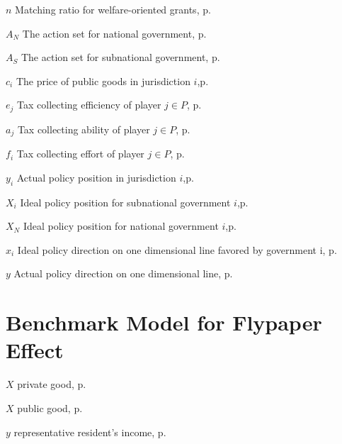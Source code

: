 \begin{eqlist}
    \item[$n$]
    Matching ratio for welfare-oriented grants, p.~\pageref{generalandcategorical}

    \item[$A_N$]
    The action set for national government, p.~\pageref{generalandcategorical}

    \item[$A_S$]
    The action set for subnational government, p.~\pageref{generalandcategorical}

    \item[$c_i$]
    The price of public goods in jurisdiction $i$,p.~\pageref{priceandeffort}

    \item[$e_j$]
    Tax collecting efficiency of player $j \in P$, p.~\pageref{priceandeffort}

    \item[$a_j$]
    Tax collecting ability of player $j \in P$, p.~\pageref{priceandeffort}

    \item[$f_i$]
    Tax collecting effort of player $j \in P$, p.~\pageref{priceandeffort}

    \item[$y_i$]
    Actual policy position in jurisdiction $i$,p.~\pageref{actposition}

    \item[$X_i$]
    Ideal policy position for subnational government $i$,p.~\pageref{iposition}

    \item[$X_N$]
    Ideal policy position for national government $i$,p.~\pageref{actposition}

    \item[$x_i$]
    Ideal policy direction on one dimensional line favored by government i, p.~\pageref{demand}

    \item[$y$]
    Actual policy direction on one dimensional line, p.~\pageref{demand}
    \section*{Benchmark Model for Flypaper Effect}

    \item[$X$]
    private good, p.~\pageref{G}

    \item[$X$]
    public good, p.~\pageref{X}

    \item[$y$]
    representative resident's income, p.~\pageref{y}


\end{eqlist}
